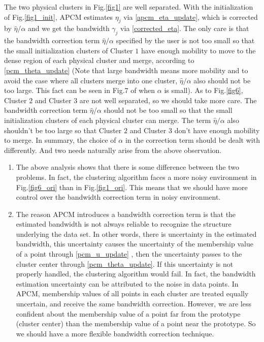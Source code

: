 \documentclass[journal]{IEEEtran}
\theoremstyle{definition}
\begin{document}
The two physical clusters in Fig.\ref{fig1} are well separated. With the initialization of Fig.\ref{fig1_init}, APCM estimates $\eta_j$ via \eqref{apcm_eta_update}, which is corrected by $\hat{\eta}/\alpha$ and we get the bandwidth $\gamma_j$ via \eqref{corrected_eta}. The only care is that the bandwidth correction term $\hat{\eta}/\alpha$ specified by the user is not too small so that the small initialization clusters of Cluster $1$ have enough mobility to move to the dense region of each physical cluster and  merge, according to \eqref{pcm_theta_update} (Note that large bandwidth means more mobility and to avoid the case where all clusters merge into one cluster, $\hat{\eta}/\alpha$ also should not be too large. This fact can be seen in Fig.7 of \cite{xenaki_novel_2016} when $\alpha$ is small).
As to Fig.\ref{fig6}, Cluster $2$ and Cluster $3$ are not well separated, so we should take more care. The bandwidth correction term $\hat{\eta}/\alpha$ should not be too small so that the small initialization clusters of each physical cluster can merge. The term $\hat{\eta}/\alpha$ also shouldn't be too large so that Cluster $2$ and Cluster $3$ don't have enough mobility to merge.
In summary, the choice of $\alpha$ in the correction term should be dealt with differently. And two needs naturally arise from the above observation.
\begin{enumerate}
\item The above analysis shows that there is some difference between the two problems. In fact, the clustering algorithm faces a more noisy environment in Fig.\ref{fig6_ori} than in Fig.\ref{fig1_ori}. This means that we should have more control over the bandwidth correction term in noisy environment.
\item The reason APCM introduces a bandwidth correction term is that the estimated bandwidth is not always reliable to recognize the structure underlying the data set. In other words, there is uncertainty in the estimated bandwidth, this uncertainty causes the uncertainty of the membership value of a point through \eqref{pcm_u_update} , then the uncertainty passes to the cluster center through \eqref{pcm_theta_update}. If this uncertainty is not properly handled, the clustering algorithm would fail. 
In fact, the bandwidth estimation uncertainty can be attributed to the noise in data points.
In APCM, membership values of all points in each cluster are treated equally uncertain, and receive the same bandwidth correction.
However, we are less confident about the membership value of a point far from the prototype (cluster center) than the membership value of a point near the prototype. So we should have a more flexible bandwidth correction technique.
\end{enumerate}
\end{document}
